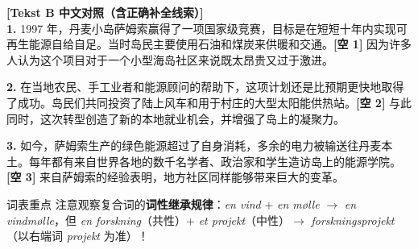 \begin{transbox}
\small
\textbf{\color{NCDTeal}[Tekst B 中文对照（含正确补全线索）]}\\
\textbf{1.} 1997 年，丹麦小岛萨姆索赢得了一项国家级竞赛，目标是在短短十年内实现可再生能源自给自足。当时岛民主要使用石油和煤炭来供暖和交通。\textbf{[空 1]} 因为许多人认为这个项目对于一个小型海岛社区来说既太昂贵又过于激进。

\textbf{2.} 在当地农民、手工业者和能源顾问的帮助下，这项计划还是比预期更快地取得了成功。岛民们共同投资了陆上风车和用于村庄的大型太阳能供热站。\textbf{[空 2]} 与此同时，这次转型创造了新的本地就业机会，并增强了岛上的凝聚力。

\textbf{3.} 如今，萨姆索生产的绿色能源超过了自身消耗，多余的电力被输送往丹麦本土。每年都有来自世界各地的数千名学者、政治家和学生造访岛上的能源学院。\textbf{[空 3]} 来自萨姆索的经验表明，地方社区同样能够带来巨大的变革。
\end{transbox}


\begin{tipbox}{词表重点}
注意观察复合词的\textbf{词性继承规律}：\textit{en vind} + \textit{en mølle} $\rightarrow$ \textit{en vindmølle}，但 \textit{en forskning}（共性）+ \textit{et projekt}（中性）$\rightarrow$  \textit{forskningsprojekt}（以右端词 \textit{projekt} 为准）！
\end{tipbox}

